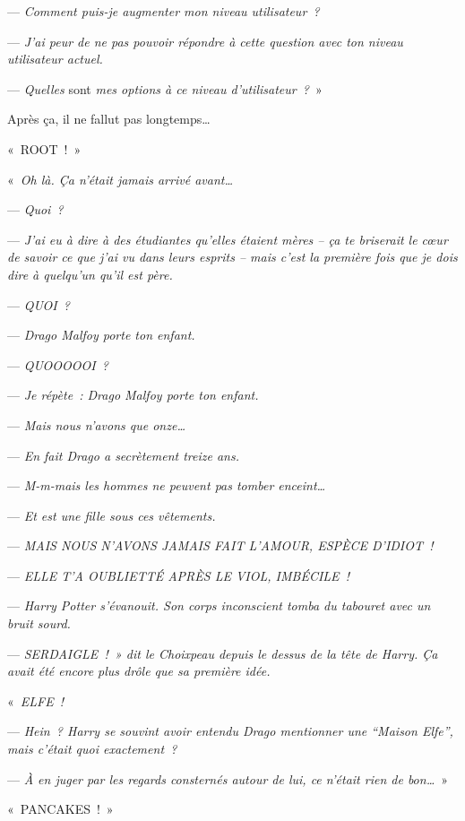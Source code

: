 --- \emph{Comment puis-je augmenter mon niveau utilisateur~?}

--- \emph{J'ai peur de ne pas pouvoir répondre à cette question avec ton niveau utilisateur actuel.}

--- \emph{Quelles} sont \emph{mes options à ce niveau d'utilisateur~?}~»

Après ça, il ne fallut pas longtemps…

«~ROOT~!~»

\later

«~\emph{Oh là. Ça n'était jamais arrivé avant…}

--- \emph{Quoi~?}

--- \emph{J'ai eu à dire à des étudiantes qu'elles étaient mères -- ça te briserait le cœur de savoir ce que j'ai vu dans leurs esprits -- mais c'est la première fois que je dois dire à quelqu'un qu'il est père.}

--- \emph{QUOI~?}

--- \emph{Drago Malfoy porte ton enfant.}

--- \emph{QUOOOOOI~?}

--- \emph{Je répète~: Drago Malfoy porte ton enfant.}

--- \emph{Mais nous n'avons que onze…}

--- \emph{En fait Drago a secrètement treize ans.}

--- \emph{M-m-mais les hommes ne peuvent pas tomber enceint…}

--- \emph{Et est une fille sous ces vêtements.}

--- \emph{MAIS NOUS N'AVONS JAMAIS FAIT L'AMOUR, ESPÈCE D'IDIOT~!}

--- \emph{ELLE T'A OUBLIETTÉ APRÈS LE VIOL, IMBÉCILE~!}

--- \emph{Harry Potter s'évanouit. Son corps inconscient tomba du tabouret avec un bruit sourd.}

--- \emph{SERDAIGLE~!~» dit le Choixpeau depuis le dessus de la tête de Harry. Ça avait été encore plus drôle que sa première idée.}

\later

«~\emph{ELFE~!}

--- \emph{Hein~? Harry se souvint avoir entendu Drago mentionner une “Maison Elfe”, mais c'était quoi exactement~?}

--- \emph{À en juger par les regards consternés autour de lui, ce n'était rien de bon…}~»

\later

«~PANCAKES~!~»

